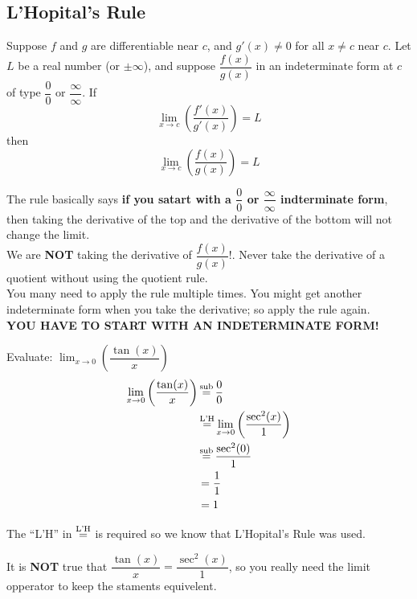 \subsection{L'Hopital's Rule}
\begin{theorem}
    Suppose $f$ and $g$ are differentiable near $c$, and $g'(x) \neq 0$ for all $x \neq c$ near $c$. Let $L$ be a real number (or $\pm \infty$), and suppose $\dfrac{f(x)}{g(x)}$ in an indeterminate form at $c$ of type $\dfrac{0}{0}$ or $\dfrac{\infty}{\infty}$. If
    \begin{equation}
        \lim_{x \to c}\left(\dfrac{f'(x)}{g'(x)}\right) = L
    \end{equation}
    then
    \begin{equation}
        \lim_{x \to c}\left(\dfrac{f(x)}{g(x)}\right) = L
    \end{equation}
\end{theorem}
The rule basically says \textbf{if you satart with a $\dfrac{0}{0}$ or $\dfrac{\infty}{\infty}$ indterminate form}, then taking the derivative of the top and the derivative of the bottom will not change the limit.\\
We are \textbf{NOT} taking the derivative of $\dfrac{f(x)}{g(x)}$!. Never take the derivative of a quotient without using the quotient rule.\\ %
You many need to apply the rule multiple times. You might get another indeterminate form when you take the derivative; so apply the rule again.\\
\textbf{YOU HAVE TO START WITH AN INDETERMINATE FORM!}
\begin{example}
    Evaluate: $\lim_{x \to 0}\left(\dfrac{\tan(x)}{x}\right)$ \\
    \begin{align*}
        \lim_{x \to 0}\left(\dfrac{\tan(x)}{x}\right) &\operatorname{\overset{\mathrm{sub}}{=}} \dfrac{0}{0} \\
        &\operatorname{\overset{\mathrm{L'H}}{=}} \lim_{x \to 0}\left(\dfrac{\sec^2(x)}{1}\right) \\
        &\operatorname{\overset{\mathrm{sub}}{=}} \dfrac{\sec^2(0)}{1} \\
        &= \dfrac{1}{1} \\
        &= 1
    \end{align*}
    \begin{note}
        The ``L'H'' in $\operatorname{\overset{\mathrm{L'H}}{=}}$ is required so we know that L'Hopital's Rule was used.
    \end{note}
    \begin{note}
        It is \textbf{NOT} true that $\dfrac{\tan(x)}{x} = \dfrac{\sec^2(x)}{1}$, so you really need the limit opperator to keep the staments equivelent.
    \end{note}
\end{example}

